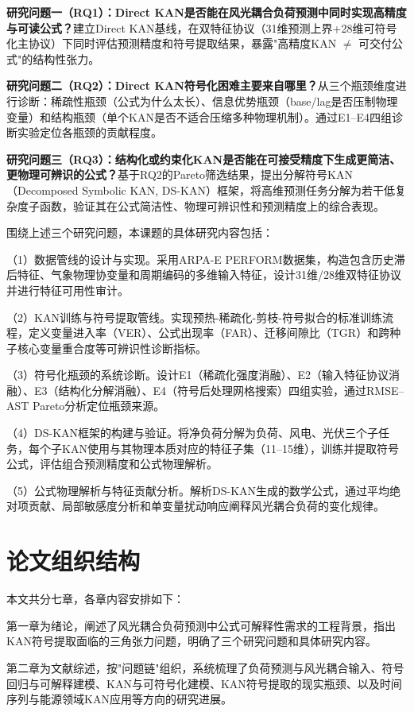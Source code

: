 \documentclass[12pt,a4paper,oneside]{ctexbook}
\begin{document}
\textbf{研究问题一（RQ1）：Direct KAN是否能在风光耦合负荷预测中同时实现高精度与可读公式？}建立Direct KAN基线，在双特征协议（31维预测上界+28维可符号化主协议）下同时评估预测精度和符号提取结果，暴露"高精度KAN $\neq$ 可交付公式"的结构性张力。

\textbf{研究问题二（RQ2）：Direct KAN符号化困难主要来自哪里？}从三个瓶颈维度进行诊断：稀疏性瓶颈（公式为什么太长）、信息优势瓶颈（base/lag是否压制物理变量）和结构瓶颈（单个KAN是否不适合压缩多种物理机制）。通过E1--E4四组诊断实验定位各瓶颈的贡献程度。

\textbf{研究问题三（RQ3）：结构化或约束化KAN是否能在可接受精度下生成更简洁、更物理可辨识的公式？}基于RQ2的Pareto筛选结果，提出分解符号KAN（Decomposed Symbolic KAN, DS-KAN）框架，将高维预测任务分解为若干低复杂度子函数，验证其在公式简洁性、物理可辨识性和预测精度上的综合表现。

围绕上述三个研究问题，本课题的具体研究内容包括：

（1）数据管线的设计与实现。采用ARPA-E PERFORM数据集，构造包含历史滞后特征、气象物理协变量和周期编码的多维输入特征，设计31维/28维双特征协议并进行特征可用性审计。

（2）KAN训练与符号提取管线。实现预热-稀疏化-剪枝-符号拟合的标准训练流程，定义变量进入率（VER）、公式出现率（FAR）、迁移间隙比（TGR）和跨种子核心变量重合度等可辨识性诊断指标。

（3）符号化瓶颈的系统诊断。设计E1（稀疏化强度消融）、E2（输入特征协议消融）、E3（结构化分解消融）、E4（符号后处理网格搜索）四组实验，通过RMSE--AST Pareto分析定位瓶颈来源。

（4）DS-KAN框架的构建与验证。将净负荷分解为负荷、风电、光伏三个子任务，每个子KAN使用与其物理本质对应的特征子集（11--15维），训练并提取符号公式，评估组合预测精度和公式物理解析。

（5）公式物理解析与特征贡献分析。解析DS-KAN生成的数学公式，通过平均绝对项贡献、局部敏感度分析和单变量扰动响应阐释风光耦合负荷的变化规律。

\section{论文组织结构}

本文共分七章，各章内容安排如下：

第一章为绪论，阐述了风光耦合负荷预测中公式可解释性需求的工程背景，指出KAN符号提取面临的三角张力问题，明确了三个研究问题和具体研究内容。

第二章为文献综述，按"问题链"组织，系统梳理了负荷预测与风光耦合输入、符号回归与可解释建模、KAN与可符号化建模、KAN符号提取的现实瓶颈、以及时间序列与能源领域KAN应用等方向的研究进展。
\end{document}
